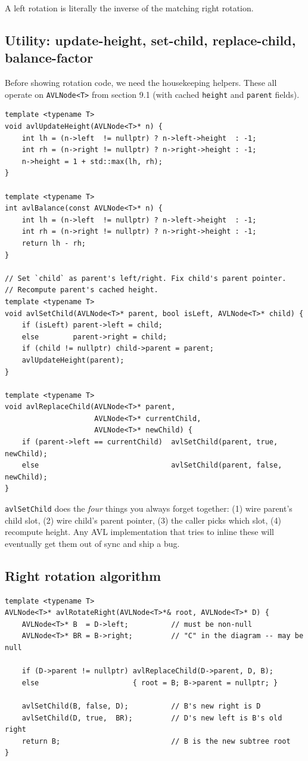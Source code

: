 \documentclass[11pt]{article}
\begin{document}
A left rotation is literally the inverse of the matching right rotation.

\subsection*{Utility: update-height, set-child, replace-child, balance-factor}

Before showing rotation code, we need the housekeeping helpers. These all operate on \texttt{AVLNode<T>} from section 9.1 (with cached \texttt{height} and \texttt{parent} fields).

\begin{lstlisting}
template <typename T>
void avlUpdateHeight(AVLNode<T>* n) {
    int lh = (n->left  != nullptr) ? n->left->height  : -1;
    int rh = (n->right != nullptr) ? n->right->height : -1;
    n->height = 1 + std::max(lh, rh);
}

template <typename T>
int avlBalance(const AVLNode<T>* n) {
    int lh = (n->left  != nullptr) ? n->left->height  : -1;
    int rh = (n->right != nullptr) ? n->right->height : -1;
    return lh - rh;
}

// Set `child` as parent's left/right. Fix child's parent pointer.
// Recompute parent's cached height.
template <typename T>
void avlSetChild(AVLNode<T>* parent, bool isLeft, AVLNode<T>* child) {
    if (isLeft) parent->left = child;
    else        parent->right = child;
    if (child != nullptr) child->parent = parent;
    avlUpdateHeight(parent);
}

template <typename T>
void avlReplaceChild(AVLNode<T>* parent,
                     AVLNode<T>* currentChild,
                     AVLNode<T>* newChild) {
    if (parent->left == currentChild)  avlSetChild(parent, true,  newChild);
    else                               avlSetChild(parent, false, newChild);
}
\end{lstlisting}

\texttt{avlSetChild} does the \emph{four} things you always forget together: (1) wire parent's child slot, (2) wire child's parent pointer, (3) the caller picks which slot, (4) recompute height. Any AVL implementation that tries to inline these will eventually get them out of sync and ship a bug.

\subsection*{Right rotation algorithm}

\begin{lstlisting}
template <typename T>
AVLNode<T>* avlRotateRight(AVLNode<T>*& root, AVLNode<T>* D) {
    AVLNode<T>* B  = D->left;          // must be non-null
    AVLNode<T>* BR = B->right;         // "C" in the diagram -- may be null

    if (D->parent != nullptr) avlReplaceChild(D->parent, D, B);
    else                      { root = B; B->parent = nullptr; }

    avlSetChild(B, false, D);          // B's new right is D
    avlSetChild(D, true,  BR);         // D's new left is B's old right
    return B;                          // B is the new subtree root
}
\end{lstlisting}
\end{document}
